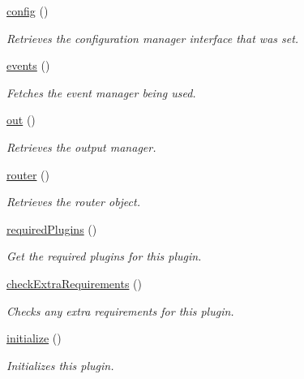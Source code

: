 \begin{DoxyCompactItemize}
\hyperlink{classGenericPlugin_aa7c4a335f37ee83cd131be29ed469c82}{config} ()
\begin{DoxyCompactList}\small\item\em Retrieves the configuration manager interface that was set. \end{DoxyCompactList}\item 
\hyperlink{classGenericPlugin_ab7d46f8bdaf1540eee1b988073294298}{events} ()
\begin{DoxyCompactList}\small\item\em Fetches the event manager being used. \end{DoxyCompactList}\item 
\hyperlink{classGenericPlugin_a005937e2c819abbb56fdc4b10fdeb666}{out} ()
\begin{DoxyCompactList}\small\item\em Retrieves the output manager. \end{DoxyCompactList}\item 
\hyperlink{classGenericPlugin_adc6c23c436e9979ed2c5b07dde6f3931}{router} ()
\begin{DoxyCompactList}\small\item\em Retrieves the router object. \end{DoxyCompactList}\item 
\hyperlink{classGenericPlugin_a32850f8424953482ef2b07df130941cf}{required\-Plugins} ()
\begin{DoxyCompactList}\small\item\em Get the required plugins for this plugin. \end{DoxyCompactList}\item 
\hyperlink{classGenericPlugin_a53983a917eccd1ee4b06355f688c0960}{check\-Extra\-Requirements} ()
\begin{DoxyCompactList}\small\item\em Checks any extra requirements for this plugin. \end{DoxyCompactList}\item 
\hyperlink{interfacePluginInterface_aa99b3d9a7b3d99cc603584e5bee521a1}{initialize} ()
\begin{DoxyCompactList}\small\item\em Initializes this plugin. \end{DoxyCompactList}\end{DoxyCompactItemize}

